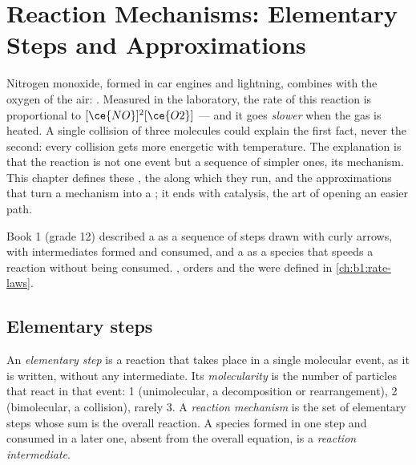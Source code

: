 \chapter{Reaction Mechanisms: Elementary Steps and Approximations}\label{ch:b1:elementary-steps}

Nitrogen monoxide, formed in car engines and lightning, combines with the
oxygen of the air: . Measured in the laboratory, the
rate of this reaction is proportional to $[\ce{NO}]^2[\ce{O2}]$ --- and it
goes \emph{slower} when the gas is heated. A single collision of three
molecules could explain the first fact, never the second: every
collision gets more energetic with temperature. The explanation is that
the reaction is not one event but a sequence of simpler ones, its
mechanism. This chapter defines these , the  along which they run, and the approximations that turn a
mechanism into a ; it ends with catalysis, the art of opening an
easier path.

\begin{recall}
Book 1 (grade 12) described a  as a sequence of steps
drawn with curly arrows, with intermediates formed and consumed, and a
 as a species that speeds a reaction without being consumed.
, orders and the  were defined in
\cref{ch:b1:rate-laws}.
\end{recall}

\section{Elementary steps}

\begin{definition}\label{def:b1:elementary-steps:elementary-step}
An \emph{elementary step} is a reaction that takes
place in a single molecular event, as it is written, without any
intermediate. Its \emph{molecularity} is the number of
particles that react in that event: 1 (unimolecular, a decomposition or
rearrangement), 2 (bimolecular, a collision), rarely 3. A \emph{reaction
mechanism} is the set of elementary steps whose
sum is the overall reaction. A species formed in one step and consumed in
a later one, absent from the overall equation, is a \emph{reaction
intermediate}.
\end{definition}


